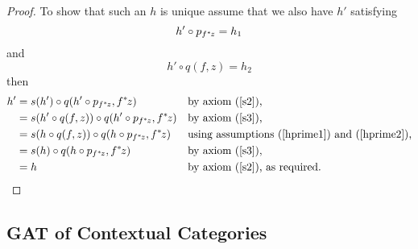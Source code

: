 \documentclass[10pt,a4paper]{scrartcl}
\renewcommand{\sub}{^*\kern-1pt}
\newcommand{\byaxiom}[1]{by axiom (\ref{#1})}
\begin{document}
\begin{proof}
\noindent 
To show that such an $h$ is unique assume that we also have $h'$ satisfying
\begin{equation}
\label{hprime1}
h' \circ p_{f \sub z} = h_1
\end{equation}
and
\begin{equation}
\label{hprime2}
h' \circ q(f,z) = h_2
\end{equation}
\noindent then
\begin{align*}
h'
        & = s(h') \circ q(h' \circ p_{f \sub z},f \sub z)              &&\mbox{\byaxiom{s2},}                           \\
		& = s(h' \circ q(f,z)) \circ q(h' \circ p_{f \sub z},f \sub z) &&\mbox{\byaxiom{s3}, }                          \\
        & = s(h  \circ q(f,z)) \circ q(h \circ p_{f \sub z},f \sub z)  &&\mbox{using assumptions (\ref{hprime1}) and (\ref{hprime2}),} \\
		& = s(h)               \circ q(h \circ p_{f \sub z},f \sub z)  &&\mbox{\byaxiom{s3},}                           \\
		& = h                                                          &&\mbox{\byaxiom{s2}, as required.}
\end{align*}
\end{proof}

\subsection{GAT of Contextual Categories}
\end{document}
